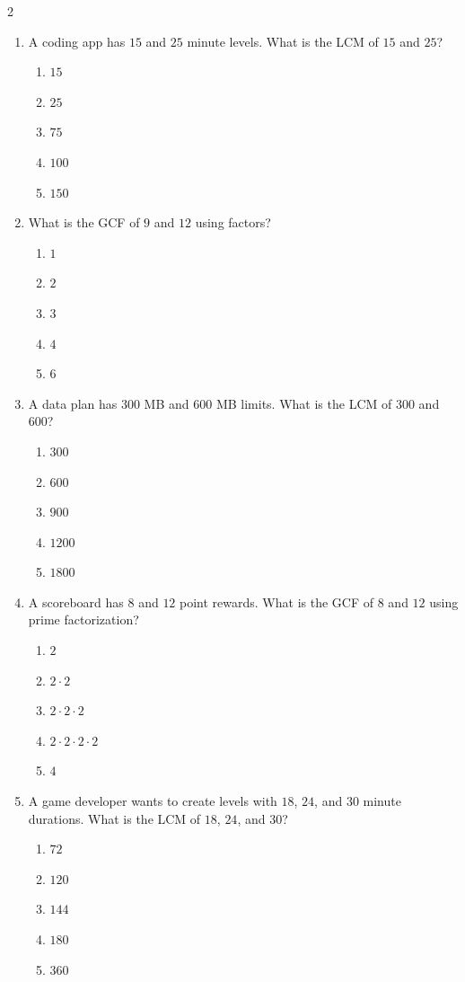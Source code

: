 \documentclass[10pt]{article}
\begin{document}
\begin{multicols}{2}
\begin{enumerate}[label=\textbf{Q\arabic*.}, leftmargin=*, itemsep=6pt, parsep=0pt]
  \item \small A coding app has $15$ and $25$ minute levels. What is the LCM of $15$ and $25$?
  \begin{enumerate}[label=(\Alph*), leftmargin=0.6cm, nosep, itemsep=2pt]
    \item $15$
    \item $25$
    \item $75$
    \item $100$
    \item $150$
  \end{enumerate}

  \item \small What is the GCF of $9$ and $12$ using factors?
  \begin{enumerate}[label=(\Alph*), leftmargin=0.6cm, nosep, itemsep=2pt]
    \item $1$
    \item $2$
    \item $3$
    \item $4$
    \item $6$
  \end{enumerate}

  \item \small A data plan has $300$ MB and $600$ MB limits. What is the LCM of $300$ and $600$?
  \begin{enumerate}[label=(\Alph*), leftmargin=0.6cm, nosep, itemsep=2pt]
    \item $300$
    \item $600$
    \item $900$
    \item $1200$
    \item $1800$
  \end{enumerate}

  \item \small A scoreboard has $8$ and $12$ point rewards. What is the GCF of $8$ and $12$ using prime factorization?
  \begin{enumerate}[label=(\Alph*), leftmargin=0.6cm, nosep, itemsep=2pt]
    \item $2$
    \item $2 \cdot 2$
    \item $2 \cdot 2 \cdot 2$
    \item $2 \cdot 2 \cdot 2 \cdot 2$
    \item $4$
  \end{enumerate}

  \item \small A game developer wants to create levels with $18$, $24$, and $30$ minute durations. What is the LCM of $18$, $24$, and $30$?
  \begin{enumerate}[label=(\Alph*), leftmargin=0.6cm, nosep, itemsep=2pt]
    \item $72$
    \item $120$
    \item $144$
    \item $180$
    \item $360$
  \end{enumerate}


\end{enumerate}
\end{multicols}
\end{document}

